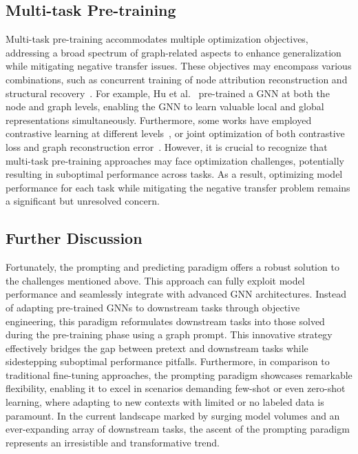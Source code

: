 \subsection{Multi-task Pre-training}\label{subsec:multi_pre}
Multi-task pre-training accommodates multiple optimization objectives, addressing a broad spectrum of graph-related aspects to enhance generalization while mitigating negative transfer issues. These objectives may encompass various combinations, such as concurrent training of node attribution reconstruction and structural recovery~\cite{hu2020strategies, hu2020gptgnn, zhang2020graphbert, 
fang2022geometryenhanced}. For example, Hu et al.~\cite{hu2020strategies} pre-trained a GNN at both the node and graph levels, enabling the GNN to learn valuable local and global representations simultaneously. Furthermore, some works have employed contrastive learning at different levels~\cite{jiang2021contrastive, xu2021infogcl}, or joint optimization of both contrastive loss and graph reconstruction error~\cite{li2023adaptergnn}. However, it is crucial to recognize that multi-task pre-training approaches may face optimization challenges, potentially resulting in suboptimal performance across tasks. As a result, optimizing model performance for each task while mitigating the negative transfer problem remains a significant but unresolved concern.




\subsection{Further Discussion} \label{subsec:pre-train-dis}
Fortunately, the prompting and predicting paradigm offers a robust solution to the challenges mentioned above. This approach can fully exploit model performance and seamlessly integrate with advanced GNN architectures. Instead of adapting pre-trained GNNs to downstream tasks through objective engineering, this paradigm reformulates downstream tasks into those solved during the pre-training phase using a graph prompt. This innovative strategy effectively bridges the gap between pretext and downstream tasks while sidestepping suboptimal performance pitfalls. Furthermore, in comparison to traditional fine-tuning approaches, the prompting paradigm showcases remarkable flexibility, enabling it to excel in scenarios demanding few-shot or even zero-shot learning, where adapting to new contexts with limited or no labeled data is paramount. In the current landscape marked by surging model volumes and an ever-expanding array of downstream tasks, the ascent of the prompting paradigm represents an irresistible and transformative trend.

